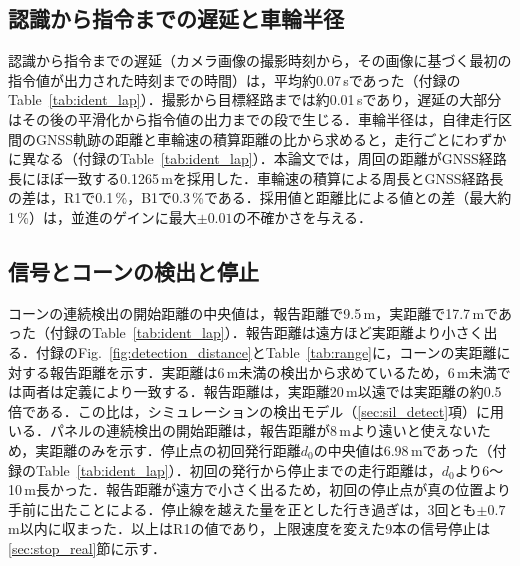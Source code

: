 \subsection{認識から指令までの遅延と車輪半径}
認識から指令までの遅延（カメラ画像の撮影時刻から，その画像に基づく最初の指令値が出力された時刻までの時間）は，平均約0.07\,sであった（付録のTable~\ref{tab:ident_lap}）．撮影から目標経路までは約0.01\,sであり，遅延の大部分はその後の平滑化から指令値の出力までの段で生じる．車輪半径は，自律走行区間のGNSS軌跡の距離と車輪速の積算距離の比から求めると，走行ごとにわずかに異なる（付録のTable~\ref{tab:ident_lap}）．本論文では，周回の距離がGNSS経路長にほぼ一致する0.1265\,mを採用した．車輪速の積算による周長とGNSS経路長の差は，R1で0.1\,\%，B1で0.3\,\%である．採用値と距離比による値との差（最大約1\,\%）は，並進のゲインに最大$\pm 0.01$の不確かさを与える．

\subsection{信号とコーンの検出と停止}
コーンの連続検出の開始距離の中央値は，報告距離で9.5\,m，実距離で17.7\,mであった（付録のTable~\ref{tab:ident_lap}）．報告距離は遠方ほど実距離より小さく出る．付録のFig.~\ref{fig:detection_distance}とTable~\ref{tab:range}に，コーンの実距離に対する報告距離を示す．実距離は6\,m未満の検出から求めているため，6\,m未満では両者は定義により一致する．報告距離は，実距離20\,m以遠では実距離の約0.5倍である．この比は，シミュレーションの検出モデル（\ref{sec:sil_detect}項）に用いる．パネルの連続検出の開始距離は，報告距離が8\,mより遠いと使えないため，実距離のみを示す．停止点の初回発行距離$d_0$の中央値は6.98\,mであった（付録のTable~\ref{tab:ident_lap}）．初回の発行から停止までの走行距離は，$d_0$より6〜10\,m長かった．報告距離が遠方で小さく出るため，初回の停止点が真の位置より手前に出たことによる．停止線を越えた量を正とした行き過ぎは，3回とも$\pm 0.7$\,m以内に収まった．以上はR1の値であり，上限速度を変えた9本の信号停止は\ref{sec:stop_real}節に示す．

